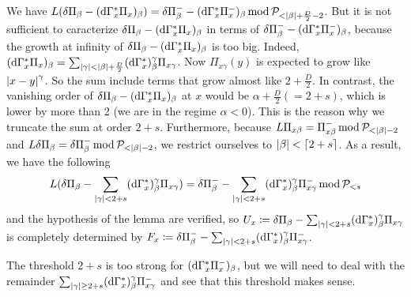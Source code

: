 We have $L(\delta \Pi_\beta - (\mathrm{d}\Gamma^*_x \Pi_{x})_\beta) =\delta \Pi_\beta^- - (\mathrm{d}\Gamma^*_x \Pi_{x}^-)_\beta \operatorname*{mod} \mathcal{P}_{<\left| \beta \right|+\frac{D}{2} - 2}$.
But it is not sufficient to caracterize $\delta \Pi_\beta - (\mathrm{d}\Gamma^*_x \Pi_{x})_\beta$ in terms of $\delta \Pi_\beta^- - (\mathrm{d}\Gamma^*_x \Pi_{x}^-)_\beta$, because the growth at infinity of $\delta \Pi_\beta - (\mathrm{d}\Gamma^*_x \Pi_{x})_\beta$ is too big.
Indeed, $(\mathrm{d}\Gamma^*_x \Pi_x)_\beta = \sum_{\left| \gamma \right|< \left| \beta \right| + \frac{D}{2}} (\mathrm{d}\Gamma^*_x)_\beta^\gamma \Pi_{x\gamma}$. Now $\Pi_{x\gamma}(y)$ is expected to grow like $\left| x-y \right|^\gamma$. So the sum include terms that grow almost like $2+\frac{D}{2}$.
In contrast, the vanishing order of $\delta \Pi_\beta - (\mathrm{d}\Gamma^*_x \Pi_{x})_\beta$ at $x$ would be $\alpha + \frac{D}{2} (=2+s)$, which is lower by more than 2 (we are in the regime $\alpha<0$).
This is the reason why we truncate the sum at order $2+s$. 
Furthermore, because $L\Pi_{x\beta} = \Pi_{x\beta}^- \operatorname*{mod} \mathcal{P}_{<\left| \beta \right|-2}$ and $L\delta\Pi_{\beta} = \delta\Pi_{\beta}^- \operatorname*{mod} \mathcal{P}_{<\left| \beta \right|-2}$, we restrict ourselves to $\left| \beta \right|<\lceil 2+s \rceil$.
As a result, we have the following 
\begin{equation}
    L(\delta \Pi_\beta - \sum_{\left| \gamma \right|< 2+s} (\mathrm{d}\Gamma^*_x)_\beta^\gamma \Pi_{x\gamma}) =\delta \Pi_\beta^- - \sum_{\left| \gamma \right|< 2+s} (\mathrm{d}\Gamma^*_x)_\beta^\gamma \Pi_{x\gamma}^- \operatorname*{mod} \mathcal{P}_{<s}
\end{equation}
and the hypothesis of the lemma are verified, so $U_x \coloneq \delta \Pi_\beta - \sum_{\left| \gamma \right|< 2+s} (\mathrm{d}\Gamma^*_x)_\beta^\gamma \Pi_{x\gamma}$ is completely determined by $F_x \coloneq \delta \Pi_\beta^- - \sum_{\left| \gamma \right|< 2+s} (\mathrm{d}\Gamma^*_x)_\beta^\gamma \Pi_{x\gamma}^-$.

\begin{remark}
    The threshold $2+s$ is too strong for $(\mathrm{d}\Gamma^*_x \Pi_{x}^-)_\beta$, but we will need to deal with the remainder $\sum_{\left| \gamma \right| \geq 2+s} (\mathrm{d}\Gamma^*_x)_\beta^\gamma \Pi_{x\gamma}^-$ and see that this threshold makes sense.
\end{remark}

